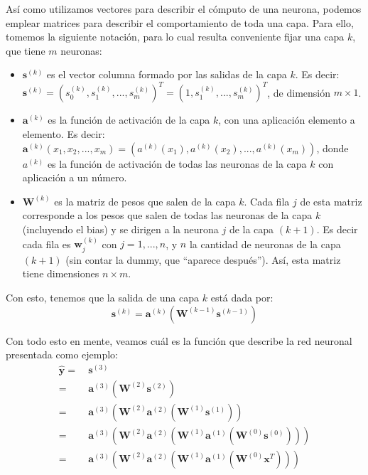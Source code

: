 \documentclass[../../main.tex]{subfiles}
\begin{document}
Así como utilizamos vectores para describir el cómputo de una neurona, podemos emplear
matrices para describir el comportamiento de toda una capa. Para ello, tomemos la siguiente
notación, para lo cual resulta conveniente fijar una capa \(k\), que tiene \(m\)
neuronas:
\begin{itemize}[itemsep=0.1cm]
    \item \(\bm{s}^{(k)}\) es el vector columna formado por las salidas de la capa
    \(k\). Es decir: \(\bm{s}^{(k)} = (s_0^{(k)}, s_1^{(k)}, ..., s_m^{(k)})^T = (1,
    s_1^{(k)}, ..., s_m^{(k)})^T\), de dimensión \(m \times 1\).
    \item \(\bm{a}^{(k)}\) es la función de activación de la capa \(k\), con una aplicación
    elemento a elemento. Es decir: \(\bm{a}^{(k)}(x_1, x_2, ..., x_m) = (a^{(k)}(x_1),
    a^{(k)}(x_2), ..., a^{(k)}(x_m))\), donde \(a^{(k)}\) es la función de activación
    de todas las neuronas de la capa \(k\) con aplicación a un número.
    \item \(\bm{W}^{(k)}\) es la matriz de pesos que salen de la capa \(k\). Cada fila
    \(j\) de esta matriz corresponde a los pesos que salen de todas las neuronas de la capa
    \(k\) (incluyendo el bias) y se dirigen a la neurona \(j\) de la capa \((k+1)\). Es
    decir cada fila es \(\bm{w}^{(k)}_j\) con \(j = 1,...,n\), y \(n\) la cantidad de
    neuronas de la capa \((k+1)\) (sin contar la dummy, que ``aparece después''). Así,
    esta matriz tiene dimensiones \(n \times m\).
\end{itemize}
Con esto, tenemos que la salida de una capa \(k\) está dada por:
\[
    \bm{s}^{(k)} = \bm{a}^{(k)} \left( \bm{W}^{(k-1)} \bm{s}^{(k-1)} \right)
\]

Con todo esto en mente, veamos cuál es la función que describe la red neuronal presentada
como ejemplo:
\begin{align*}
    \bm{\hat{y}} =\ & \bm{s}^{(3)} \\
        =\ & \bm{a}^{(3)} \left( \bm{W}^{(2)} \bm{s}^{(2)} \right) \\
        =\ & \bm{a}^{(3)} \left(
            \bm{W}^{(2)} \bm{a}^{(2)} \left(
                \bm{W}^{(1)} \bm{s}^{(1)}
            \right)
        \right) \\
        =\ & \bm{a}^{(3)} \left(
            \bm{W}^{(2)} \bm{a}^{(2)} \left(
                \bm{W}^{(1)} \bm{a}^{(1)} \left( \bm{W}^{(0)} \bm{s}^{(0)} \right)
            \right)
        \right) \\
        =\ & \bm{a}^{(3)} \left(
            \bm{W}^{(2)} \bm{a}^{(2)} \left(
                \bm{W}^{(1)} \bm{a}^{(1)} \left( \bm{W}^{(0)} \bm{x}^T \right)
            \right)
        \right)
\end{align*}
\end{document}
